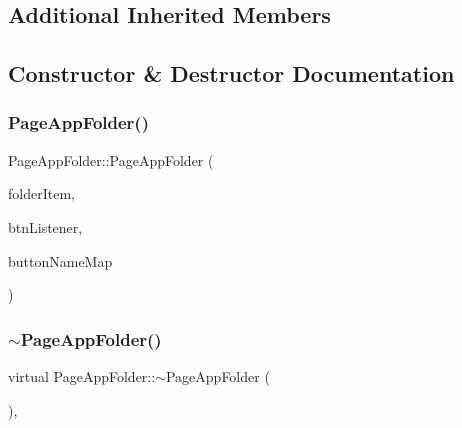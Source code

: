 \subsection*{Additional Inherited Members}


\subsection{Constructor \& Destructor Documentation}
\mbox{\label{classPageAppFolder_a0c5e4015a885b703f251e0379d6ec9b4}} 
\subsubsection{\texorpdfstring{Page\+App\+Folder()}{PageAppFolder()}}
{\footnotesize\ttfamily Page\+App\+Folder\+::\+Page\+App\+Folder (\begin{DoxyParamCaption}\item[{\mbox{\hyperlink{classAppMenuItem_ab5f51c5d74f8df62b8862c0cc8126cb7}{App\+Menu\+Item\+::\+Ptr}}}]{folder\+Item,  }\item[{Mouse\+Listener $\ast$}]{btn\+Listener,  }\item[{std\+::map$<$ String, \mbox{\hyperlink{classAppMenuButton_aeb692efb6a933970de8eac14e5e71544}{App\+Menu\+Button\+::\+Ptr}} $>$ \&}]{button\+Name\+Map }\end{DoxyParamCaption})}

\mbox{\label{classPageAppFolder_ac13fb86b1e0b8bb8109ea9fbe979253b}} 
\subsubsection{\texorpdfstring{$\sim$\+Page\+App\+Folder()}{~PageAppFolder()}}
{\footnotesize\ttfamily virtual Page\+App\+Folder\+::$\sim$\+Page\+App\+Folder (\begin{DoxyParamCaption}{ }\end{DoxyParamCaption})\hspace{0.3cm}{\ttfamily [inline]}, {\ttfamily [virtual]}}



